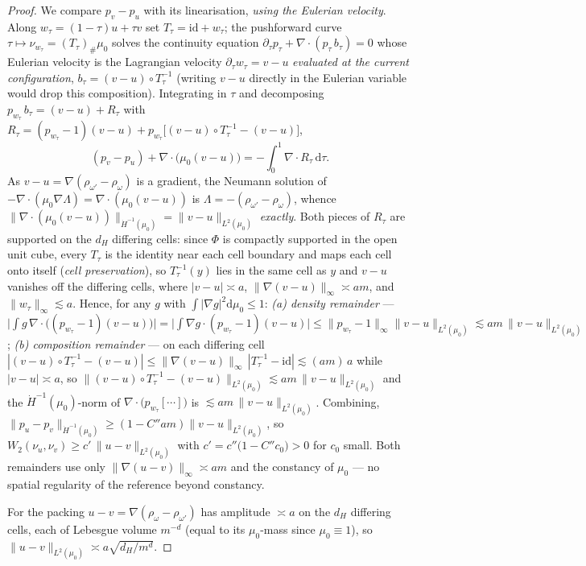 \documentclass[11pt]{article}
\theoremstyle{definition}
\theoremstyle{remark}
\begin{document}
\begin{proof}
We compare $p_v-p_u$ with its linearisation, \emph{using the Eulerian velocity}. Along
$w_\tau=(1-\tau)u+\tau v$ set $T_\tau=\mathrm{id}+w_\tau$; the pushforward curve
$\tau\mapsto\nu_{w_\tau}=(T_\tau)_\#\mu_0$ solves the continuity equation
$\partial_\tau p_\tau+\nabla\!\cdot(p_\tau\,b_\tau)=0$ whose Eulerian velocity is the Lagrangian
velocity $\partial_\tau w_\tau=v-u$ \emph{evaluated at the current configuration},
$b_\tau=(v-u)\circ T_\tau^{-1}$ (writing $v-u$ directly in the Eulerian variable would drop this
composition). Integrating in $\tau$ and decomposing
$p_{w_\tau}\,b_\tau=(v-u)+R_\tau$ with
$R_\tau=(p_{w_\tau}-1)(v-u)+p_{w_\tau}\big[(v-u)\circ T_\tau^{-1}-(v-u)\big]$,
\[
  (p_v-p_u)+\nabla\!\cdot\!\big(\mu_0(v-u)\big)=-\!\int_0^1\nabla\!\cdot R_\tau\,\mathrm d\tau.
\]
As $v-u=\nabla(\rho_{\omega'}-\rho_\omega)$ is a gradient, the Neumann solution of
$-\nabla\!\cdot(\mu_0\nabla\Lambda)=\nabla\!\cdot(\mu_0(v-u))$ is $\Lambda=-(\rho_{\omega'}-\rho_\omega)$,
whence $\|\nabla\!\cdot(\mu_0(v-u))\|_{\dot H^{-1}(\mu_0)}=\|v-u\|_{L^2(\mu_0)}$ \emph{exactly}.
Both pieces of $R_\tau$ are supported on the $d_H$ differing cells: since $\Phi$ is compactly
supported in the open unit cube, every $T_\tau$ is the identity near each cell boundary and maps each
cell onto itself (\emph{cell preservation}), so $T_\tau^{-1}(y)$ lies in the same cell as $y$ and
$v-u$ vanishes off the differing cells, where $|v-u|\asymp a$, $\|\nabla(v-u)\|_\infty\asymp am$, and
$\|w_\tau\|_\infty\lesssim a$. Hence, for any $g$ with $\int|\nabla g|^2\mathrm d\mu_0\le1$:
\emph{(a) density remainder} ---
$\big|\int g\,\nabla\!\cdot\!\big((p_{w_\tau}-1)(v-u)\big)\big|=\big|\int\nabla g\cdot(p_{w_\tau}-1)(v-u)\big|
\le\|p_{w_\tau}-1\|_\infty\|v-u\|_{L^2(\mu_0)}\lesssim am\,\|v-u\|_{L^2(\mu_0)}$;
\emph{(b) composition remainder} --- on each differing cell
$|(v-u)\circ T_\tau^{-1}-(v-u)|\le\|\nabla(v-u)\|_\infty\,|T_\tau^{-1}-\mathrm{id}|\lesssim(am)\,a$ while
$|v-u|\asymp a$, so $\|(v-u)\circ T_\tau^{-1}-(v-u)\|_{L^2(\mu_0)}\lesssim am\,\|v-u\|_{L^2(\mu_0)}$ and the
$\dot H^{-1}(\mu_0)$-norm of $\nabla\!\cdot\!\big(p_{w_\tau}[\cdots]\big)$ is
$\lesssim am\,\|v-u\|_{L^2(\mu_0)}$. Combining, $\|p_u-p_v\|_{\dot H^{-1}(\mu_0)}\ge(1-C''am)\|v-u\|_{L^2(\mu_0)}$,
so $W_2(\nu_u,\nu_v)\ge c'\,\|u-v\|_{L^2(\mu_0)}$ with $c'=c''\big(1-C''c_0\big)>0$ for $c_0$ small.
Both remainders use only $\|\nabla(u-v)\|_\infty\asymp am$ and the constancy of $\mu_0$ --- no
spatial regularity of the reference beyond constancy.

For the packing $u-v=\nabla(\rho_\omega-\rho_{\omega'})$ has amplitude $\asymp a$ on the $d_H$ differing
cells, each of Lebesgue volume $m^{-d}$ (equal to its $\mu_0$-mass since $\mu_0\equiv1$), so
$\|u-v\|_{L^2(\mu_0)}\asymp a\sqrt{d_H/m^d}$.
\end{proof}
\end{document}

